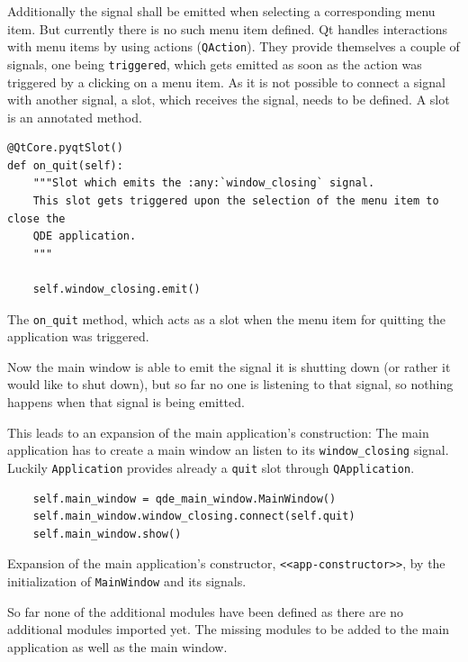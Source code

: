 \documentclass[10pt, openright, notitlepage]{scrreprt}
\begin{document}
Additionally the signal shall be emitted when selecting a corresponding menu
item. But currently there is no such menu item defined. Qt handles interactions
with menu items by using actions (\texttt{QAction}). They provide themselves a couple
of signals, one being \texttt{triggered}, which gets emitted as soon as the action was
triggered by a clicking on a menu item. As it is not possible to connect a
signal with another signal, a slot, which receives the signal, needs to be
defined. A slot is an annotated method.

\begin{listing}[H]
\begin{verbatim}
@QtCore.pyqtSlot()
def on_quit(self):
    """Slot which emits the :any:`window_closing` signal.
    This slot gets triggered upon the selection of the menu item to close the
    QDE application.
    """

    self.window_closing.emit()
\end{verbatim}
\caption{\label{main-window-slots}
The \texttt{on\_quit} method, which acts as a slot when the menu item for quitting the application was triggered.}
\end{listing}

Now the main window is able to emit the signal it is shutting down (or
rather it would like to shut down), but so far no one is listening to that
signal, so nothing happens when that signal is being emitted.

This leads to an expansion of the main application's construction: The main
application has to create a main window an listen to its \texttt{window\_closing}
signal. Luckily \texttt{Application} provides already a \texttt{quit} slot through
\texttt{QApplication}.

\begin{listing}[H]
\begin{verbatim}
    self.main_window = qde_main_window.MainWindow()
    self.main_window.window_closing.connect(self.quit)
    self.main_window.show()
\end{verbatim}
\caption{\label{app-constructor}
Expansion of the main application's constructor, \texttt{<<app-constructor>>}, by the initialization of \texttt{MainWindow} and its signals.}
\end{listing}

So far none of the additional modules have been defined as there are no
additional modules imported yet. The missing modules to be added to the main
application as well as the main window.
\end{document}
